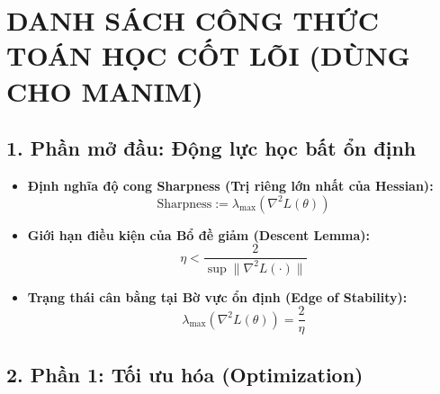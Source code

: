 \documentclass[oneside,a4paper,13pt]{extarticle}
\begin{document}
\section*{DANH SÁCH CÔNG THỨC TOÁN HỌC CỐT LÕI (DÙNG CHO MANIM)}

\subsection*{1. Phần mở đầu: Động lực học bất ổn định}

\begin{itemize}
    \item \textbf{Định nghĩa độ cong Sharpness (Trị riêng lớn nhất của Hessian):}
    \begin{equation}
        \text{Sharpness} := \lambda_{\max}(\nabla^2 L(\theta))
    \end{equation}

    \item \textbf{Giới hạn điều kiện của Bổ đề giảm (Descent Lemma):}
    \begin{equation}
        \eta < \frac{2}{\sup\|\nabla^2 L(\cdot)\|}
    \end{equation}

    \item \textbf{Trạng thái cân bằng tại Bờ vực ổn định (Edge of Stability):}
    \begin{equation}
        \lambda_{\max}(\nabla^2 L(\theta)) = \frac{2}{\eta}
    \end{equation}
\end{itemize}

\newpage

\subsection*{2. Phần 1: Tối ưu hóa (Optimization)}
\end{document}
